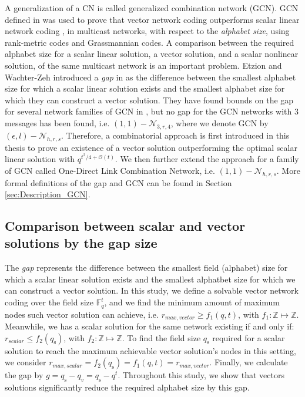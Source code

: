 A generalization of a CN \cite{Riis:2006} is called generalized combination
network (GCN). GCN defined in \cite{Etzion:2016,Wachter-Zeh:2018}
was used to prove that vector network coding outperforms scalar linear
network coding , in multicast networks, with respect to the \textit{alphabet
size}, using rank-metric codes and Grassmannian codes. A comparison
between the required alphabet size for a scalar linear solution, a
vector solution, and a scalar nonlinear solution, of the same multicast
network is an important problem. Etzion and Wachter-Zeh introduced
a \textit{gap} in \cite{Etzion:2016} as the difference between the
smallest alphabet size for which a scalar linear solution exists and
the smallest alphabet size for which they can construct a vector solution.
They have found bounds on the gap for several network families of
GCN in \cite{Etzion:2016,Wachter-Zeh:2018}, but no gap for the GCN
networks with 3 messages has been found, i.e. $(1,1)-\mathcal{N}_{3,r,4}$,
where we denote GCN by $(\epsilon,l)-\mathcal{N}_{h,r,s}$. Therefore,
a combinatorial approach is first introduced in this thesis to prove
an existence of a vector solution outperforming the optimal scalar
linear solution with $q^{t^{2}/4+\mathcal{O}(t)}$. We then further
extend the approach for a family of GCN called One-Direct Link Combination
Network, i.e. $(1,1)-\mathcal{N}_{h,r,s}$. More formal definitions
of the gap and GCN can be found in Section \ref{sec:Description_GCN}. 

\subsection{Comparison between scalar and vector solutions by the gap size \label{subsec:Comparison-between-scalar-and-vector-sol}}

The \textit{gap} represents the difference between the smallest field
(alphabet) size for which a scalar linear solution exists and the
smallest alphatbet size for which we can construct a vector solution.
In this study, we define a solvable vector network coding over the
field size $\ensuremath{\mathbb{F}}_{q}^{t}$, and we find the minimum
amount of maximum nodes such vector solution can achieve, i.e. $r_{max,vector}\geq f_{1}(q,t)$,
with $f_{1}:\mathbb{Z}\mapsto\mathbb{Z}$. Meanwhile, we has a scalar
solution for the same network existing if and only if: $r_{scalar}\leq f_{2}\left(q_{\mathrm{s}}\right)$,
with $f_{2}:\mathbb{Z}\mapsto\mathbb{Z}$. To find the field size
$q_{\mathrm{s}}$ required for a scalar solution to reach the maximum
achievable vector solution's nodes in this setting, we consider $r_{max,scalar}=f_{2}\left(q_{\mathrm{s}}\right)=f_{1}(q,t)=r_{max,vector}$.
Finally, we calculate the gap by $g=q_{\mathrm{s}}-q_{v}=q_{\mathrm{s}}-q^{t}.$
Throughout this study, we show that vectors solutions significantly
reduce the required alphabet size by this gap. 

\clearpage